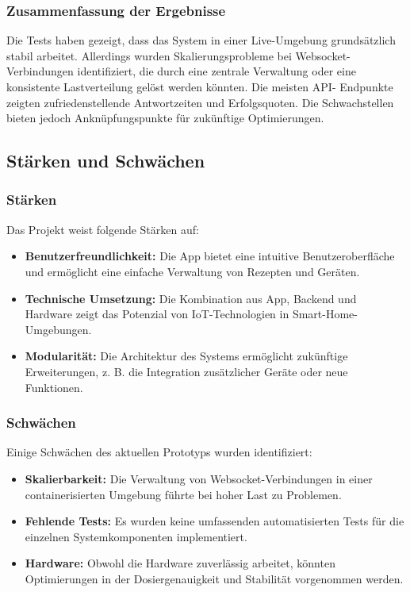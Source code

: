 \subsubsection*{Zusammenfassung der Ergebnisse}


Die Tests haben gezeigt, dass das System in einer Live-Umgebung grundsätzlich stabil arbeitet. 
Allerdings wurden Skalierungsprobleme bei Websocket-Verbindungen identifiziert, die durch eine 
zentrale Verwaltung oder eine konsistente Lastverteilung gelöst werden könnten. Die meisten API-
Endpunkte zeigten zufriedenstellende Antwortzeiten und Erfolgsquoten. Die Schwachstellen bieten 
jedoch Anknüpfungspunkte für zukünftige Optimierungen.

\subsection{Stärken und Schwächen}

\subsubsection*{Stärken}

Das Projekt weist folgende Stärken auf:
\begin{itemize}
  \item \textbf{Benutzerfreundlichkeit:} Die App bietet eine intuitive Benutzeroberfläche und ermöglicht eine einfache Verwaltung von Rezepten und Geräten.
  \item \textbf{Technische Umsetzung:} Die Kombination aus App, Backend und Hardware zeigt das Potenzial von IoT-Technologien in Smart-Home-Umgebungen.
  \item \textbf{Modularität:} Die Architektur des Systems ermöglicht zukünftige Erweiterungen, z. B. die Integration zusätzlicher Geräte oder neue Funktionen.
\end{itemize}

\subsubsection*{Schwächen}

Einige Schwächen des aktuellen Prototyps wurden identifiziert:
\begin{itemize}
  \item \textbf{Skalierbarkeit:} Die Verwaltung von Websocket-Verbindungen in einer containerisierten Umgebung führte bei hoher Last zu Problemen.
  \item \textbf{Fehlende Tests:} Es wurden keine umfassenden automatisierten Tests für die einzelnen Systemkomponenten implementiert.
  \item \textbf{Hardware:} Obwohl die Hardware zuverlässig arbeitet, könnten Optimierungen in der Dosiergenauigkeit und Stabilität vorgenommen werden.
\end{itemize}

